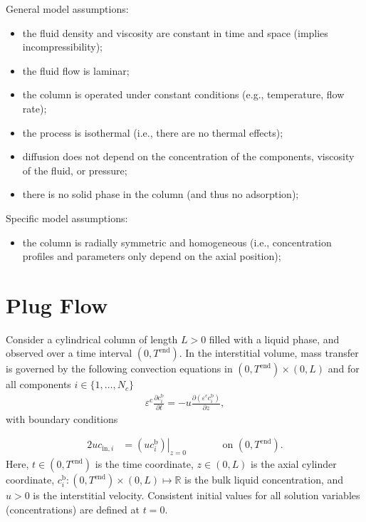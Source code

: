 \documentclass{article}
\begin{document}
General model assumptions:
\begin{itemize}
\item the fluid density and viscosity are constant in time and space (implies incompressibility);
\item the fluid flow is laminar;
\item the column is operated under constant conditions (e.g., temperature, flow rate);
\item the process is isothermal (i.e., there are no thermal effects);
\item diffusion does not depend on the concentration of the components, viscosity of the fluid, or pressure;
\item there is no solid phase in the column (and thus no adsorption);
\end{itemize}


Specific model assumptions:
\begin{itemize}
\item the column is radially symmetric and homogeneous (i.e., concentration profiles and parameters only depend on the axial position);
\end{itemize}


\section*{Plug Flow}
Consider a cylindrical column of length $L > 0$ filled with a liquid phase, and observed over a time interval $(0, T^{\mathrm{end}})$.
In the interstitial volume, mass transfer is governed by the following convection equations in $(0, T^\mathrm{end})\times (0, L)$ and for all components $i\in\{1, \dots, N_c\}$
\begin{align}
\varepsilon^{\mathrm{c}} \frac{\partial c^{\mathrm{b}}_i}{\partial t} = - u \frac{\partial \left( \varepsilon^{\mathrm{c}} c^{\mathrm{b}}_i \right)}{\partial z},
\end{align}
with boundary conditions

\begin{alignat}{2}
u c_{\mathrm{in},i} &= \left.\left( u c^{\mathrm{b}}_i \right)\right|_{z=0} & &\qquad\text{on }(0, T^{\mathrm{end}}).
\end{alignat}
Here, $t\in (0, T^{\mathrm{end}})$ is the time coordinate, $z\in (0, L)$ is the axial cylinder coordinate, $c^\mathrm{b}_i\colon (0, T^\mathrm{end})\times (0, L) \mapsto \mathbb{R}$ is the bulk liquid concentration, and $u> 0$ is the interstitial velocity.
Consistent initial values for all solution variables (concentrations) are defined at $t = 0$.
\end{document}
